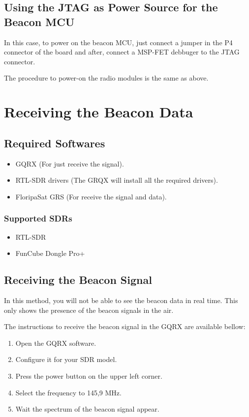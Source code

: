 \documentclass[12pt]{book}
\begin{document}
\begin{appendices}
\section{Using the JTAG as Power Source for the Beacon MCU}

In this case, to power on the beacon MCU, just connect a jumper in the P4 connector of the board and after, connect a MSP-FET debbuger to the JTAG connector.

The procedure to power-on the radio modules is the same as above.

\chapter{Receiving the Beacon Data}

\section{Required Softwares}

\begin{itemize}
    \item GQRX (For just receive the signal).
    \item RTL-SDR drivers (The GRQX will install all the required drivers).
    \item FloripaSat GRS (For receive the signal and data).
\end{itemize}

\subsection{Supported SDRs}

\begin{itemize}
    \item RTL-SDR
    \item FunCube Dongle Pro+
\end{itemize}

\section{Receiving the Beacon Signal}

In this method, you will not be able to see the beacon data in real time. This only shows the presence of the beacon signals in the air.

The instructions to receive the beacon signal in the GQRX are available bellow:

\begin{enumerate}
    \item Open the GQRX software.
    \item Configure it for your SDR model.
    \item Press the power button on the upper left corner.
    \item Select the frequency to 145,9 MHz.
    \item Wait the spectrum of the beacon signal appear.
\end{enumerate}


\end{appendices}
\end{document}
